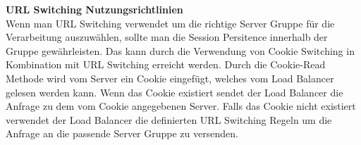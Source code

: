 \textbf{URL Switching Nutzungsrichtlinien} \\

Wenn man URL Switching verwendet um die richtige Server Gruppe für die Verarbeitung auszuwählen, sollte man die Session Persitence innerhalb der Gruppe gewährleisten. Das kann durch die Verwendung von Cookie Switching in Kombination mit URL Switching erreicht werden. Durch die Cookie-Read Methode wird vom Server ein Cookie eingefügt, welches vom Load Balancer gelesen werden kann. Wenn das Cookie existiert sendet der Load Balancer die Anfrage zu dem vom Cookie angegebenen Server. Falls das Cookie nicht existiert verwendet der Load Balancer die definierten URL Switching Regeln um die Anfrage an die passende Server Gruppe zu versenden. \cite{LoadBalancing2}

